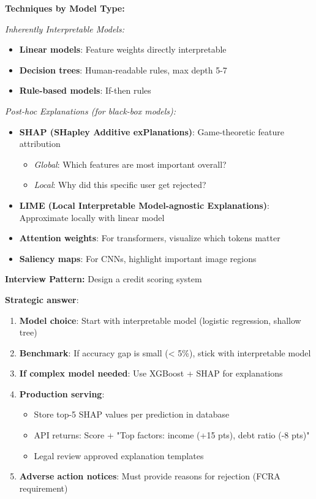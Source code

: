 \documentclass[10pt]{article}
\begin{document}
\textbf{Techniques by Model Type:}

\textit{Inherently Interpretable Models:}
\begin{itemize}
\item \textbf{Linear models}: Feature weights directly interpretable
\item \textbf{Decision trees}: Human-readable rules, max depth 5-7
\item \textbf{Rule-based models}: If-then rules
\end{itemize}

\textit{Post-hoc Explanations (for black-box models):}
\begin{itemize}
\item \textbf{SHAP (SHapley Additive exPlanations)}: Game-theoretic feature attribution
\begin{itemize}
\item \textit{Global}: Which features are most important overall?
\item \textit{Local}: Why did this specific user get rejected?
\end{itemize}
\item \textbf{LIME (Local Interpretable Model-agnostic Explanations)}: Approximate locally with linear model
\item \textbf{Attention weights}: For transformers, visualize which tokens matter
\item \textbf{Saliency maps}: For CNNs, highlight important image regions
\end{itemize}

\textbf{Interview Pattern:} Design a credit scoring system

\textbf{Strategic answer}:
\begin{enumerate}
\item \textbf{Model choice}: Start with interpretable model (logistic regression, shallow tree)
\item \textbf{Benchmark}: If accuracy gap is small (< 5\%), stick with interpretable model
\item \textbf{If complex model needed}: Use XGBoost + SHAP for explanations
\item \textbf{Production serving}:
\begin{itemize}
\item Store top-5 SHAP values per prediction in database
\item API returns: Score + "Top factors: income (+15 pts), debt ratio (-8 pts)"
\item Legal review approved explanation templates
\end{itemize}
\item \textbf{Adverse action notices}: Must provide reasons for rejection (FCRA requirement)
\end{enumerate}
\end{document}
